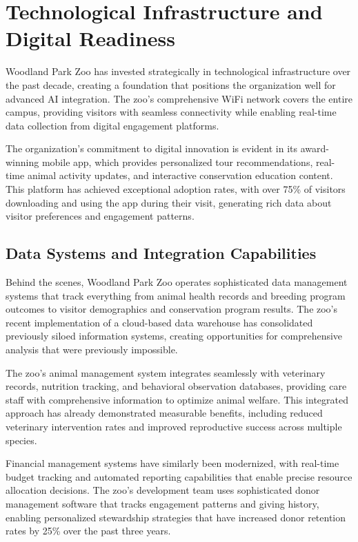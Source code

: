 \documentclass[
  Letterpaper,
]{scrbook}
\begin{document}
\section{Technological Infrastructure and Digital
Readiness}\label{technological-infrastructure-and-digital-readiness}

Woodland Park Zoo has invested strategically in technological
infrastructure over the past decade, creating a foundation that
positions the organization well for advanced AI integration. The zoo's
comprehensive WiFi network covers the entire campus, providing visitors
with seamless connectivity while enabling real-time data collection from
digital engagement platforms.

The organization's commitment to digital innovation is evident in its
award-winning mobile app, which provides personalized tour
recommendations, real-time animal activity updates, and interactive
conservation education content. This platform has achieved exceptional
adoption rates, with over 75\% of visitors downloading and using the app
during their visit, generating rich data about visitor preferences and
engagement patterns.

\subsection{Data Systems and Integration
Capabilities}\label{data-systems-and-integration-capabilities}

Behind the scenes, Woodland Park Zoo operates sophisticated data
management systems that track everything from animal health records and
breeding program outcomes to visitor demographics and conservation
program results. The zoo's recent implementation of a cloud-based data
warehouse has consolidated previously siloed information systems,
creating opportunities for comprehensive analysis that were previously
impossible.

The zoo's animal management system integrates seamlessly with veterinary
records, nutrition tracking, and behavioral observation databases,
providing care staff with comprehensive information to optimize animal
welfare. This integrated approach has already demonstrated measurable
benefits, including reduced veterinary intervention rates and improved
reproductive success across multiple species.

Financial management systems have similarly been modernized, with
real-time budget tracking and automated reporting capabilities that
enable precise resource allocation decisions. The zoo's development team
uses sophisticated donor management software that tracks engagement
patterns and giving history, enabling personalized stewardship
strategies that have increased donor retention rates by 25\% over the
past three years.
\end{document}
